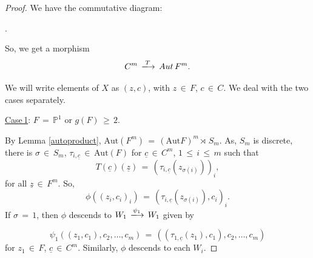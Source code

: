 \documentclass[10pt,a4paper]{amsart}
\theoremstyle{plain}
\theoremstyle{definition}
\theoremstyle{remark}
\begin{document}
\begin{proof}
We have the commutative diagram:

\begin{center}
.
\end{center}
So, we get a morphism 
\begin{equation}\label{map to aut}
C^{m}\,\xlongrightarrow{T}\, \textrm{Aut}\,F^{m}.
\end{equation}

We will write elements of $X$ as $(z,c)$, with $z\,\in\, F$, $c\,\in\, C.$
We deal with the two cases separately.

\underline{Case\,1}: $F\,=\, \mathbb{P}^{1}$ or $g(F)\,\geq\, 2$.

By Lemma \ref{autoproduct}, $\textrm{Aut}(F^{m})\,=\, (\textrm{Aut}F)^{m} \rtimes\, S_{m}$. As, $S_{m}$ is discrete, there is $\sigma\,\in\, S_{m}$, $\tau_{i,\underline{c}}\,\in\, \textrm{Aut}(F)$ for $\underline{c}\,\in\, C^{m}$, $1\,\leq\,i\,\leq\,m$ such that
\begin{equation*}
T(\underline{c})(\underline{z})\,=\, (\tau_{i,\underline{c}}(z_{\sigma(i)}))_{i},    
\end{equation*} for all $\underline{z}\,\in\, F^m.$
So, 
\begin{equation}\label{horr p1}
\phi((z_{i},c_{i})_{i})\,=\, (\tau_{i,\underline{c}}(z_{\sigma(i)}), c_{i})_{i}. 
\end{equation}
If $\sigma\,=\, 1$, then $\phi$ descends to $W_{1}\,\xlongrightarrow{\psi_{1}}\,W_{1}$ given by 

\begin{equation*}
\psi_{1}((z_{1},c_{1}), c_{2},\ldots, c_{m}) \,=\, \left((\tau_{1,\underline{c}}(z_{1}), c_{1}),c_{2},\ldots,c_{m}\right)   
\end{equation*}
for $z_{1}\,\in\,F$, $\underline{c}\,\in\,C^{m}$. Similarly, $\phi$ descends to each $W_{i}$. 


\end{proof}
\end{document}
